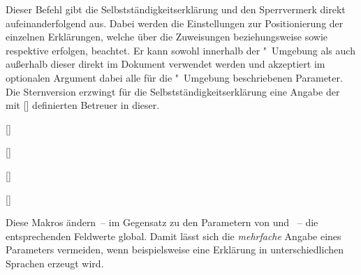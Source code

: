 \begin{DeclareEntity*}{}
\begin{DeclareEntity*}{}
\begin{DeclareEntity*}{}
\begin{Declaration}
\begin{Declaration}
\begin{Declaration}
\begin{Declaration}
\begin{Declaration}
\begin{Declaration}
\begin{Declaration}
\begin{Declaration}
\begin{Declaration}
\begin{Declaration}
\begin{Declaration}
Dieser Befehl gibt die Selbstständigkeitserklärung und den Sperrvermerk direkt 
aufeinanderfolgend aus. Dabei werden die Einstellungen zur Positionierung der 
einzelnen Erklärungen, welche über die Zuweisungen  
beziehungsweise  sowie  
respektive  erfolgen, beachtet. Er kann sowohl 
innerhalb der "~Umgebung als auch außerhalb dieser 
direkt im Dokument verwendet werden und akzeptiert im optionalen Argument dabei 
alle für die "~Umgebung beschriebenen Parameter. 
%
Die Sternversion erzwingt für die Selbstständigkeitserklärung eine Angabe der 
mit [] definierten Betreuer in dieser.
\end{Declaration}
\end{Declaration}
\end{Declaration}
\end{Declaration}
\end{Declaration}
\end{Declaration}
\end{Declaration}
\end{Declaration}
\end{Declaration}
\end{Declaration}
\end{Declaration}

\begin{Declaration}
  {[]}
\begin{Declaration}
  {[]}
\begin{Declaration}
  {[]}
\begin{Declaration}
  {[]}
\printdeclarationlist

Diese Makros ändern~-- im Gegensatz zu den Parametern von 
 und ~-- die entsprechenden Feldwerte 
global. Damit lässt sich die \emph{mehrfache} Angabe eines Parameters 
vermeiden, wenn beispielsweise eine Erklärung in unterschiedlichen Sprachen 
erzeugt wird.%
\end{Declaration}
\end{Declaration}
\end{Declaration}
\end{Declaration}
%
%




\end{DeclareEntity*}
\end{DeclareEntity*}
\end{DeclareEntity*}
